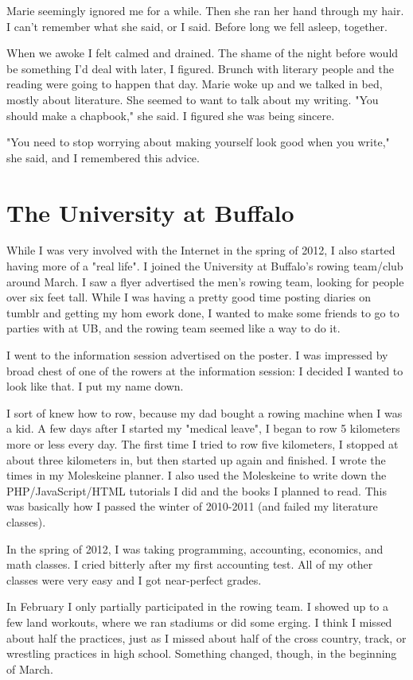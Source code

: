 \documentclass[12pt]{article}
\begin{document}
Marie seemingly ignored me for a while. Then she ran her hand through my hair.
I can't remember what she said, or I said.  Before long we fell asleep,
together.

When we awoke I felt calmed and drained.  The shame of the night before would be
something I'd deal with later, I figured.  Brunch with literary people and the
reading were going to happen that day.  Marie woke up and we talked in bed,
mostly about literature.  She seemed to want to talk about my writing.  "You
should make a chapbook," she said.  I figured she was being sincere.  

"You need to stop worrying about making yourself look good when you write," she
said, and I remembered this advice.

\section{The University at Buffalo}
While I was very involved with the Internet in the spring of 2012, I also
started having more of a "real life".  I joined the University at Buffalo's
rowing team/club around March.  I saw a flyer advertised the men's rowing team,
looking for people over six feet tall.  While I was having a pretty good time
posting diaries on tumblr and getting my hom ework done, I wanted to make some
friends to go to parties with at UB, and the  rowing team seemed like a way to do
it.  

I went to the information session advertised on the poster.  I was impressed by
 broad chest of one of the rowers at the information session: I decided I
wanted to look like that.  I put my name down.

I sort of knew how to row, because my dad bought a rowing machine when I was a
kid.  A few days after I started my "medical leave", I began to row 5
kilometers more or less every day.  The first time I tried to row five
kilometers, I stopped at about three kilometers in, but then started up again
and finished.  I wrote the times in my Moleskeine planner.  I also used the
Moleskeine to write down the PHP/JavaScript/HTML tutorials I did and the books
I planned to read.  This was basically how I passed the winter of 2010-2011
(and failed my literature classes).

In the spring of 2012, I was taking programming, accounting, economics, and
math classes.  I cried bitterly after my first accounting test.  All of my
other classes were very easy and I got near-perfect grades.

In February I only partially participated in the rowing team.  I showed up to a
few land workouts, where we ran stadiums or did some erging.  I think I
missed about half the practices, just as I missed about half of the cross
country, track, or wrestling practices in high school.  Something changed,
though, in the beginning of March.
\end{document}
